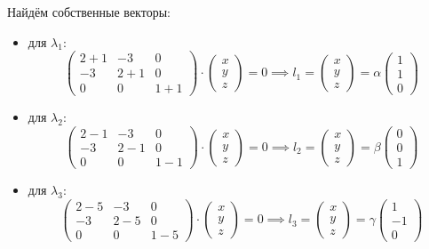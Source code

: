 Найдём собственные векторы:
\begin{itemize}
\item для \(λ_1\):
\[
  \begin{pmatrix}
    2 + 1 & -3 & 0 \\
    -3 & 2 + 1 & 0 \\
    0 & 0 & 1 + 1
  \end{pmatrix} \cdot
  \begin{pmatrix}
    x \\
    y \\
    z
  \end{pmatrix}
  = 0
  \implies
  l_1 =
  \begin{pmatrix}
    x \\
    y \\
    z
  \end{pmatrix} = α
  \begin{pmatrix}
    1 \\
    1 \\
    0
  \end{pmatrix}
\]
\item для \(λ_2\):
\[
  \begin{pmatrix}
    2 - 1 & -3 & 0 \\
    -3 & 2 - 1 & 0 \\
    0 & 0 & 1 - 1
  \end{pmatrix} \cdot
  \begin{pmatrix}
    x \\
    y \\
    z
  \end{pmatrix}
  = 0
  \implies
  l_2 =
  \begin{pmatrix}
    x \\
    y \\
    z
  \end{pmatrix} = β
  \begin{pmatrix}
    0 \\
    0 \\
    1
  \end{pmatrix}
\]
\item для \(λ_3\):
\[
  \begin{pmatrix}
    2 - 5 & -3 & 0 \\
    -3 & 2 - 5 & 0 \\
    0 & 0 & 1 - 5
  \end{pmatrix} \cdot
  \begin{pmatrix}
    x \\
    y \\
    z
  \end{pmatrix}
  = 0
  \implies
  l_3 =
  \begin{pmatrix}
    x \\
    y \\
    z
  \end{pmatrix} = γ
  \begin{pmatrix}
    1 \\
    -1 \\
    0
  \end{pmatrix}
\]
\end{itemize}
